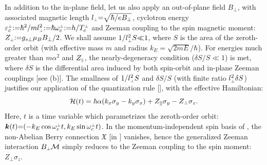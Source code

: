 \documentclass[aps, showpacs, twocolumn, notitlepage, superscriptaddress]{revtex4-1}
\begin{document}

In addition to the in-plane field, let us also apply an out-of-plane field $B_{\perp}$, with associated magnetic length $l_{\scriptscriptstyle{\perp}}{=}\sqrt{\hbar/eB_{\perp}}$, cyclotron energy $\varepsilon^{\scriptscriptstyle{\perp}}_c{:}{=}\hbar^2/ml_{\scriptscriptstyle{\perp}}^2{:}{=}\hbar \omega_c^{\scriptscriptstyle{\perp}}{:}{=}h/T_c^{\scriptscriptstyle{\perp}}$ and Zeeman coupling to the spin magnetic moment:  $Z_{\scriptscriptstyle{\perp}}{:}{=}{g_{s\perp}}\mu_B B_{\perp}/2$. We shall assume  $1/l_{\scriptscriptstyle{\perp}}^2S{\ll}1$, where $S$ is the area of the zeroth-order orbit (with effective mass $m$ and radius $k_E{=}\sqrt{2mE}/\hbar$). For energies much greater than $m\alpha^2$ and $Z_{\scriptscriptstyle{\parallel}}$, the nearly-degeneracy condition ($\delta S/S{\ll}1$) is met, where $\delta S$ is the differential area induced by both spin-orbit and in-plane Zeeman couplings [see (b)].  The smallness of $1/l_{\scriptscriptstyle{\perp}}^2S$ and $\delta S/S$ (with finite ratio $l_{\scriptscriptstyle{\perp}}^2\delta S$) justifies our application of the quantization rule [],  with the effective Hamiltonian: 
\begin{equation}
{\cal H}(t)=\hbar\alpha(k_{x}\sigma_{y}-k_{y}\sigma_{x})+Z_\parallel\sigma_{y}-Z_\perp\sigma_{z}.\label{calHRZ}
\end{equation}
Here, $t$ is a time variable which parametrizes the zeroth-order orbit:
$\boldsymbol{k}(t){=}({-}k_E \cos \omega_c^{\scriptscriptstyle{\perp}} t, k_E \sin \omega_c^{\scriptscriptstyle{\perp}} t )$. In the momentum-independent spin basis of , the non-Abelian Berry connection $\mathfrak{X}$ [in ]  vanishes, hence the generalized Zeeman interaction $B_{\scriptscriptstyle{\perp}}{\cal M}$ simply reduces to the Zeeman coupling to the spin  moment: $Z_\perp\sigma_{z}$.
\end{document}
